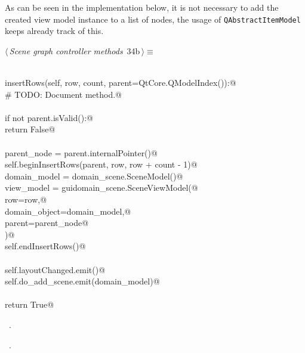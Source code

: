 \documentclass[
    a4paper,      %
    10pt,         %
    openright,    %
    notitlepage,  %
    parskip=half, %
]{scrreprt}       %
\theoremstyle{definition}                    %
\begin{document}
As can be seen in the implementation below, it is not necessary to add the
created view model instance to a list of nodes, the usage of
\verb+QAbstractItemModel+ keeps already track of this.

\begin{flushleft} \small
\begin{minipage}{\linewidth}\label{scrap38}\raggedright\small
{} $\langle\,${\itshape Scene graph controller methods}\nobreak\ {\footnotesize {34b}}$\,\rangle\equiv$
\vspace{-1ex}
\begin{list}{}{} \item
\mbox{}\lstinline@@\\
\mbox{}\lstinline@def insertRows(self, row, count, parent=QtCore.QModelIndex()):@\\
\mbox{}\lstinline@    # TODO: Document method.@\\
\mbox{}\lstinline@@\\
\mbox{}\lstinline@    if not parent.isValid():@\\
\mbox{}\lstinline@        return False@\\
\mbox{}\lstinline@@\\
\mbox{}\lstinline@    parent_node = parent.internalPointer()@\\
\mbox{}\lstinline@    self.beginInsertRows(parent, row, row + count - 1)@\\
\mbox{}\lstinline@    domain_model  = domain_scene.SceneModel()@\\
\mbox{}\lstinline@    view_model = guidomain_scene.SceneViewModel(@\\
\mbox{}\lstinline@        row=row,@\\
\mbox{}\lstinline@        domain_object=domain_model,@\\
\mbox{}\lstinline@        parent=parent_node@\\
\mbox{}\lstinline@    )@\\
\mbox{}\lstinline@    self.endInsertRows()@\\
\mbox{}\lstinline@@\\
\mbox{}\lstinline@    self.layoutChanged.emit()@\\
\mbox{}\lstinline@    self.do_add_scene.emit(domain_model)@\\
\mbox{}\lstinline@@\\
\mbox{}\lstinline@    return True@\\
\mbox{}\lstinline@@{\NWsep}
\end{list}
\vspace{-1.5ex}
\footnotesize
\begin{list}{}{\setlength{\itemsep}{-\parsep}\setlength{\itemindent}{-\leftmargin}}
\item \NWtxtMacroDefBy\ .
\item \NWtxtMacroRefIn\ .


\end{list}
\end{minipage}
\end{flushleft}
\end{document}
